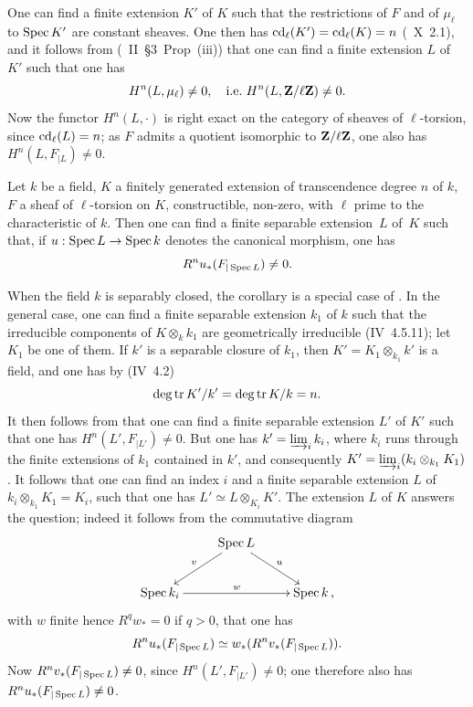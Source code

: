 One can find a finite extension $K'$ of $K$ such that the restrictions of $F$ and of $\mu_\ell$ to $\operatorname{Spec} K'$ are constant sheaves. One then has $\operatorname{cd}_{\ell}(K') = \operatorname{cd}_{\ell}(K) = n$ (~X~2.1), and it follows from (\cite{XIV.2}~II~\S 3~Prop~\textup{(iii)}) that one can find a finite extension $L$ of $K'$ such that one has
$$
H^n(L, \mu_{\ell})\neq 0, \quad\text {{i.e.}\kern.3em} H^n(L, \mathbf{Z}/\ell\mathbf{Z}) \neq 0.
$$
Now the functor $H^n(L,\cdot)$ is right exact on the category of sheaves of $\ell$-torsion, since $\operatorname{cd}_{\ell}(L)=n$; as $F$ admits a quotient isomorphic to $\mathbf{Z}/\ell\mathbf{Z}$, one also has $H^n(L, F_{|L}) \neq 0$.

\begin{corollary} \label{XIV.3.3}
Let $k$ be a field, $K$ a finitely generated extension of transcendence degree $n$ of $k$, $F$ a sheaf of $\ell$-torsion on $K$, constructible, non-zero, with $\ell$ prime to the characteristic of $k$. Then one can find a finite separable extension~$L$ of~$K$ such that, if $u: \Spec L \to \Spec k$ denotes the canonical morphism, one has
$$R^n u_*(F_{|\operatorname{Spec} L}) \neq 0.
$$
\end{corollary}

When the field $k$ is separably closed, the corollary is a special case of . In the general case, one can find a finite separable extension $k_1$ of $k$ such that the irreducible components of $K \otimes_k k_1$ are geometrically irreducible (\EGA IV~4.5.11); let $K_1$ be one of them. If $k'$ is a separable closure of $k_1$, then $K' = K_1 \otimes_{k_1} k'$ is a field, and one has by (\EGA IV~4.2)
$$
\deg \operatorname{tr} K'/k' = \deg \operatorname{tr} K/k = n.
$$
It then follows from  that one can find a finite separable extension $L'$ of $K'$ such that one has $H^n(L', F_{|L'}) \neq 0$. But one has $k' = \varinjlim_i k_i$, where $k_i$ runs through the finite extensions of $k_1$ contained in $k'$, and consequently $K' = \varinjlim_i (k_i \otimes_{k_1} K_1)$. It follows that one can find an index $i$ and a finite separable extension $L$ of $k_i \otimes_{k_1} K_1 =K_i$, such that one has $L' \simeq L \otimes_{K_i} K'$. The extension $L$ of $K$ answers the question; indeed it follows from the commutative diagram
$$
\xymatrix{
&{\Spec L}\ar[dl]_v\ar[dr]^u&\\
{\Spec k_i} \ar[rr]^w &{}&{\Spec k}\,,
}
$$
with $w$ finite hence $R^q w_* = 0$ if $q>0$, that one has
$$R^n u_*(F_{|\operatorname{Spec} L}) \simeq w_*(R^n v_*(F_{|\operatorname{Spec} L})).
$$
Now $R^nv_*(F_{|\operatorname{Spec} L}) \neq 0$, since $H^n(L', F_{|L'}) \neq 0$; one therefore also has $R^nu_*(F_{|\operatorname{Spec} L}) \neq 0$.

